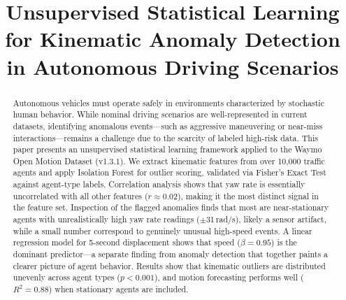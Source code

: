 \documentclass[conference]{IEEEtran}
\begin{document}
\title{Unsupervised Statistical Learning for Kinematic Anomaly Detection in Autonomous Driving Scenarios}

\author{
\and
{}
\and
{}
}

\maketitle

\begin{abstract}
Autonomous vehicles must operate safely in environments characterized by stochastic human behavior. While nominal driving scenarios are well-represented in current datasets, identifying anomalous events---such as aggressive maneuvering or near-miss interactions---remains a challenge due to the scarcity of labeled high-risk data. This paper presents an unsupervised statistical learning framework applied to the Waymo Open Motion Dataset (v1.3.1). We extract kinematic features from over 10{,}000 traffic agents and apply Isolation Forest for outlier scoring, validated via Fisher's Exact Test against agent-type labels. Correlation analysis shows that yaw rate is essentially uncorrelated with all other features ($r \approx 0.02$), making it the most distinct signal in the feature set. Inspection of the flagged anomalies finds that most are near-stationary agents with unrealistically high yaw rate readings ($\pm$31\,rad/s), likely a sensor artifact, while a small number correspond to genuinely unusual high-speed events. A linear regression model for 5-second displacement shows that speed ($\beta = 0.95$) is the dominant predictor---a separate finding from anomaly detection that together paints a clearer picture of agent behavior. Results show that kinematic outliers are distributed unevenly across agent types ($p < 0.001$), and motion forecasting performs well ($R^2 = 0.88$) when stationary agents are included.
\end{abstract}
\end{document}
